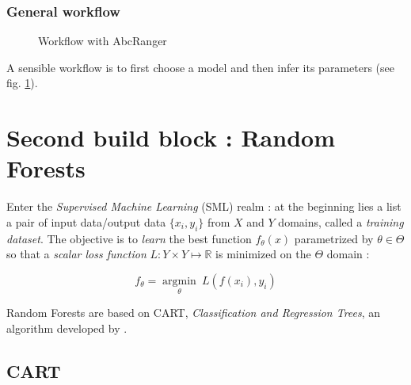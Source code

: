 \documentclass[long, final]{jobim}
\begin{document}
\subsubsection{General workflow}
\label{sec:worflow}

\begin{figure}
  \begin{center}
    \setlength{\unitlength}{5mm}
    
  \end{center}
  \caption{Workflow with AbcRanger}
  \label{fig:abc-post}
\end{figure}

A sensible workflow is to first choose a model and then infer its parameters (see fig. \ref{fig:abc-post}).

\section{Second build block : Random Forests}
\label{sec:rf}

Enter the \emph{Supervised Machine Learning} (SML) realm \cite{friedman2001elements}: at the beginning lies a list a pair of input data/output data $\{x_i,y_i\}$ from $X$ and $Y$ domains, called a \emph{training dataset}. The objective is to \emph{learn} the best function $f_\theta{}(x)$ parametrized by 
$\theta\in\Theta$ so that a \emph{scalar loss function} $L : Y \times{} Y \mapsto \mathbb{R}$ is minimized on the $\Theta$ domain :

$$f_\theta{} = \underset{\theta{}}{\operatorname{argmin}}\ L(f(x_i),y_i)$$

Random Forests are based on CART, \emph{Classification and Regression Trees}, an algorithm developed by \cite{breiman:etal:1984}.

\subsection{CART}
\label{sec:cart}
\end{document}

